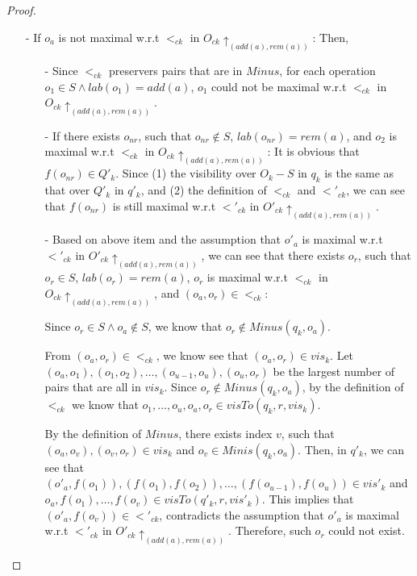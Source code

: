 \begin {proof}
\begin{itemize}
\begin{itemize}
    \item[-] If $o_a$ is not maximal w.r.t $<_{ck}$ in $O_{ck} \uparrow_{ (add(a),rem(a)) }$: Then,

        \begin{itemize}
        \setlength{\itemsep}{0.5pt}
        \item[-] Since $<_{ck}$ preservers pairs that are in $Minus$, for each operation $o_1 \in S \wedge lab(o_1) = add(a)$, $o_1$ could not be maximal w.r.t $<_{ck}$ in $O_{ck} \uparrow_{ (add(a),rem(a)) }$.

        \item[-] If there exists $o_{nr}$, such that $o_{nr} \notin S$, $lab(o_{nr}) = rem(a)$, and $o_2$ is maximal w.r.t $<_{ck}$ in $O_{ck} \uparrow_{ (add(a),rem(a)) }$: It is obvious that $f(o_{nr}) \in Q'_k$. Since (1) the visibility over $O_k - S$ in $q_k$ is the same as that over $Q'_k$ in $q'_k$, and (2) the definition of $<_{ck}$ and $<'_{ck}$, we can see that $f(o_{nr})$ is still maximal w.r.t $<'_{ck}$ in $O'_{ck} \uparrow_{ (add(a),rem(a)) }$.

        \item[-] Based on above item and the assumption that $o'_a$ is maximal w.r.t $<'_{ck}$ in $O'_{ck} \uparrow_{ (add(a),rem(a)) }$, we can see that there exists $o_r$, such that $o_r \in S$, $lab(o_r) = rem(a)$, $o_r$ is maximal w.r.t $<_{ck}$ in $O_{ck} \uparrow_{ (add(a),rem(a)) }$, and $(o_a,o_r) \in <_{ck}$:

            Since $o_r \in S \wedge o_a \notin S$, we know that $o_r \notin Minus(q_k,o_a)$.

            From $(o_a,o_r) \in <_{ck}$, we know see that $(o_a,o_r) \in \mathit{vis}_k$. Let $(o_a,o_1),(o_1,o_2),\ldots,(o_{u-1},o_u),(o_u,o_r)$ be the largest number of pairs that are all in $\mathit{vis}_k$. Since $o_r \notin Minus(q_k,o_a)$, by the definition of $<_{ck}$ we know that $o_1,\ldots,o_u,o_a,o_r \in visTo(q_k,r,\mathit{vis}_k)$.

            By the definition of $Minus$, there exists index $v$, such that $(o_a,o_v),(o_v,o_r) \in \mathit{vis}_k$ and $o_v \in Minis(q_k,o_a)$. Then, in $q'_k$, we can see that $(o'_a,f(o_1)),(f(o_1),f(o_2)),\ldots,(f(o_{u-1}),f(o_u)) \in \mathit{vis}'_k$ and $o_a,f(o_1),\ldots,f(o_v) \in visTo(q'_k,r,\mathit{vis}'_k)$. This implies that $(o'_a,f(o_v)) \in <'_{ck}$, contradicts the assumption that $o'_a$ is maximal w.r.t $<'_{ck}$ in $O'_{ck} \uparrow_{ (add(a),rem(a)) }$. Therefore, such $o_r$ could not exist.
        \end{itemize}
    \end{itemize}


\end{itemize}
\end{proof}
